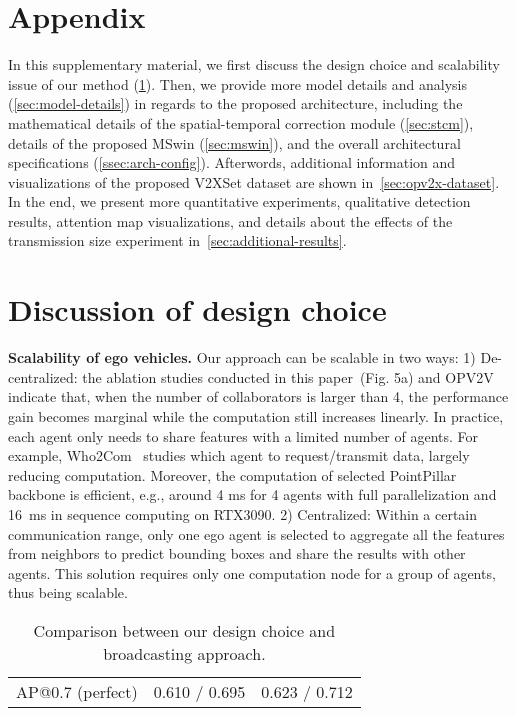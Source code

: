 \documentclass[runningheads]{llncs}
\begin{document}
\section*{Appendix}
In this supplementary material, we first discuss the design choice and scalability issue of our method (\cref{sec:design-choice}). Then, we provide more model details and analysis (\cref{sec:model-details}) in regards to the proposed architecture, including the mathematical details of the spatial-temporal correction module (\cref{sec:stcm}), details of the proposed MSwin (\cref{sec:mswin}), and the overall architectural specifications (\cref{ssec:arch-config}). Afterwords, additional information and visualizations of the proposed V2XSet dataset are shown in~\cref{sec:opv2x-dataset}. In the end, we present more quantitative experiments, qualitative detection results, attention map visualizations, and  details about the effects of the transmission size experiment in~\cref{sec:additional-results}.


\section{Discussion of design choice}
\label{sec:design-choice}
\noindent\textbf{Scalability of ego vehicles.}
Our approach can be scalable in two ways: 1) {De-centralized}: the ablation studies conducted in this paper~(Fig. 5a) and OPV2V~\cite{xu2021opv2v} indicate that, when the number of collaborators is larger than 4, the performance gain becomes marginal while the computation still increases linearly. In practice, each agent only needs to share features with a limited number of agents. For example, Who2Com~\cite{liu2020who2com} studies which agent to request/transmit data, largely reducing computation. Moreover, the computation of selected PointPillar backbone is efficient, e.g., around 4 ms for 4 agents with full parallelization and 16~ms in sequence computing on RTX3090. 2) {Centralized}: Within a certain communication range, only one ego agent is selected to aggregate all the features from neighbors to predict bounding boxes and share the results with other agents. This solution requires only one computation node for a group of agents, thus being scalable. 
\begin{table}[h]
\vspace{-4mm}
    \centering
    \footnotesize
    \def\xwidth{0.245}
    \renewcommand\thetable{T0}
    \caption{Comparison between our design choice and broadcasting approach.}
    \setlength{\tabcolsep}{2pt}
    \begin{tabular}{c|c|c}
\cellcolor{lightgray}{} &\cellcolor{lightgray}{DiscoNet (broad. / ours)}&\cellcolor{lightgray}{V2X-ViT (broad. / ours)}  \\
        \toprule
         AP@0.7 (perfect)&  0.610 / 0.695 & 0.623 / 0.712  \\
         \bottomrule
    \end{tabular}
    \label{tab:design_choice}
\vspace{-3mm}
\end{table}
\end{document}
